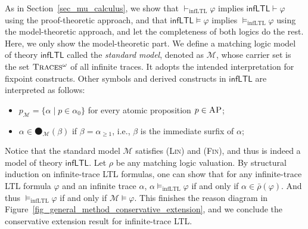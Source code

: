 \documentclass[letter,12pt]{article}
\newcommand{\MM}{\mathcal{M}}
\newcommand{\barrho}{\bar{\rho}}
\newcommand{\MLinfLTL}{\mathsf{infLTL}}
\newcommand{\infLTL}{\mathrm{infLTL}}
\newcommand{\prule}[1]{\textsc{(#1)}}
\newcommand{\AP}{\textsc{AP}}
\newcommand{\wnext}{{\medcirc}}
\newcommand{\snext}{{\medbullet}}
\newcommand{\always}{{\square}}
\newcommand{\eventually}{{\lozenge}}
\newcommand{\Us}{\mathbin{\mathsf{U}_s}}
\newcommand{\infTraces}{\textsc{Traces$^\omega$}\xspace}
\newcommand{\Inf}{\prule{Inf}\xspace}
\newcommand{\Fin}{\prule{Fin}\xspace}
\newcommand{\Lin}{\prule{Lin}\xspace}
\begin{document}
%


As in Section~\ref{sec_mu_calculus}, we show
that
$\vdash_\infLTL \varphi$ implies $\MLinfLTL \vdash \varphi$ using the proof-theoretic approach,
and that
$\MLinfLTL \vDash \varphi$ implies $\vDash_\infLTL\varphi$ using the model-theoretic approach,
and let the completeness of both logics do the rest.
Here, we only show the model-theoretic part.
We define a matching logic model of theory $\MLinfLTL$ called the \emph{standard model},
denoted as $\MM$, whose carrier set is the set $\infTraces$ of all infinite traces.
It adopts the intended interpretation for fixpoint constructs.
Other symbols and derived constructs in $\MLinfLTL$ are interpreted as follows:
\begin{itemize}
\item $p_\MM = \{ \alpha \mid p \in \alpha_0 \}$ for every atomic proposition $p \in \AP$;
\item $\alpha \in \snext_\MM(\beta)$ if $\beta = \alpha_{\ge 1}$, i.e.,
      $\beta$ is the immediate surfix of $\alpha$;
\end{itemize}
Notice that the standard model $\MM$ satisfies \Lin and \Fin, and thus is indeed a model
of theory $\MLinfLTL$.
Let $\rho$ be any matching logic valuation.
By structural induction on infinite-trace LTL formulas,
one can show that for any infinite-trace LTL formula $\varphi$ and an infinite trace $\alpha$,
$\alpha \vDash_\infLTL \varphi$ if and only if $\alpha \in \barrho(\varphi)$.
And thus $\vDash_\infLTL \varphi$ if and only if $\MM \vDash \varphi$.
This finishes the reason diagram in Figure~\ref{fig_general_method_conservative_extension},
and we conclude the conservative extension result for infinite-trace LTL.
\end{document}
